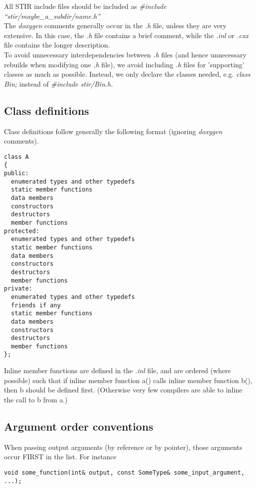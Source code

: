 \documentclass{article}
\begin{document}
All STIR include files should be included as \textit{\#include ``stir/maybe\_a\_subdir/name.h''}\\
The \textit{doxygen} comments generally occur in the \textit{.h} file, unless 
they are very extensive. In this case, the \textit{.h} file contains 
a brief comment, while the \textit{.inl} or \textit{.cxx} file contains 
the longer description.\\
To avoid unnecessary interdependencies between \textit{.h} files (and 
hence unnecessary rebuilds when modifying one \textit{.h} file), we 
avoid including \textit{.h} files for 'supporting' classes as much 
as possible. Instead, we only declare the classes needed, e.g. \textit{class 
Bin;} instead of \textit{\#include stir/Bin.h.}



\subsection{
Class definitions}

Class definitions follow generally the following format (ignoring \textit{doxygen} 
comments).

\begin{verbatim}
class A
{
public: 
  enumerated types and other typedefs 
  static member functions  
  data members  
  constructors 
  destructors 
  member functions
protected: 
  enumerated types and other typedefs 
  static member functions 
  data members 
  constructors 
  destructors 
  member functions
private: 
  enumerated types and other typedefs 
  friends if any 
  static member functions 
  data members 
  constructors 
  destructors 
  member functions
};
\end{verbatim}


Inline member functions are defined in the \textit{.inl} file, and 
are ordered (where possible) such that if inline member function 
a() calls inline member function b(), 
then b should be defined first. (Otherwise very 
few compilers are able to inline the call to b 
from a.)



\subsection{
Argument order conventions}

When passing output arguments (by reference or by pointer), those 
arguments occur FIRST in the list. For instance
\begin{verbatim}
void some_function(int& output, const SomeType& some_input_argument, ...);
\end{verbatim}
\end{document}
